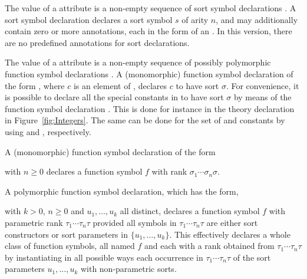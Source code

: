 The value of a  attribute is a non-empty sequence
of sort symbol declarations .
A sort symbol declaration  declares 
a sort symbol $s$ of arity $n$, and 
may additionally contain zero or more annotations,
each in the form of an .
In this version, there are no predefined annotations for sort declarations.

The value of a  attribute is a non-empty sequence
of possibly polymorphic function symbol declarations .
A (monomorphic) function symbol declaration 
of the form ,
where $c$ is an element of ,
declares $c$ to have sort $\sigma$.
For convenience,
it is possible to declare all the special constants in  
to have sort $\sigma$ by means of the function symbol declaration
.
This is done for instance in the theory declaration in Figure~\ref{fig:Integers}.
The same can be done for the set of  and  constants
by using  and , respectively. 
 
A (monomorphic) function symbol declaration of the form
\begin{center}
\end{center}
with $n \geq 0$ declares a function symbol $f$ with rank $\sigma_1\cdots\sigma_n\sigma$.

A polymorphic function symbol declaration, which has the form,
\begin{center}
\end{center}
with $k > 0$, $n \geq 0$ and $u_1, \ldots, u_k$ all distinct,
declares a function symbol $f$ with parametric rank $\tau_1\cdots\tau_n\tau$
provided all symbols in $\tau_1\cdots\tau_n\tau$ are either sort constructors
or sort parameters in $\{u_1, \ldots, u_k\}$.  
This effectively declares a whole class of function symbols, 
all named $f$ and each with a rank obtained from $\tau_1\cdots\tau_n\tau$ 
by instantiating in all possible ways each occurrence in $\tau_1\cdots\tau_n\tau$
of the sort parameters $u_1,\ldots,u_k$ with non-parametric sorts.

